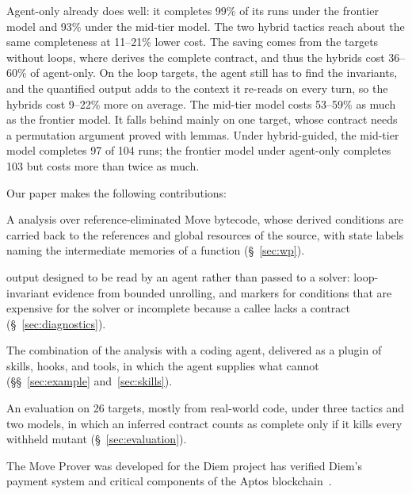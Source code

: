Agent-only already does well: it completes 99\% of its runs under the frontier model and 93\% under the mid-tier model.
The two hybrid tactics reach about the same completeness at 11--21\% lower cost.
The saving comes from the targets without loops, where \WP derives the complete contract, and thus the hybrids cost 36--60\% of agent-only.
On the loop targets, the agent still has to find the invariants, and the quantified \WP output adds to the context it re-reads on every turn, so the hybrids cost 9--22\% more on average.
The mid-tier model costs 53--59\% as much as the frontier model.
It falls behind mainly on one target, whose contract needs a permutation argument proved with lemmas.
Under hybrid-guided, the mid-tier model completes 97 of 104 runs; the frontier model under agent-only completes 103 but costs more than twice as much.

Our paper makes the following contributions:
\begin{Itemize}
\item A \WP analysis over reference-eliminated Move bytecode, whose derived conditions are carried back to the references and global resources of the source, with state labels naming the intermediate memories of a function (\S~\ref{sec:wp}).
\item \WP output designed to be read by an agent rather than passed to a solver: loop-invariant evidence from bounded unrolling, and markers for conditions that are expensive for the solver or incomplete because a callee lacks a contract (\S~\ref{sec:diagnostics}).
\item The combination of the \WP analysis with a coding agent, delivered as a plugin of skills, hooks, and tools, in which the agent supplies what \WP cannot (\S\S~\ref{sec:example} and~\ref{sec:skills}).
\item An evaluation on 26 targets, mostly from real-world code, under three tactics and two models, in which an inferred contract counts as complete only if it kills every withheld mutant (\S~\ref{sec:evaluation}).
\end{Itemize}

The Move Prover was developed for the Diem project has verified Diem's payment system and critical components of the Aptos blockchain~\cite{ParkZGXGCLC24,AptosFrameworkBook}.

\endinput
